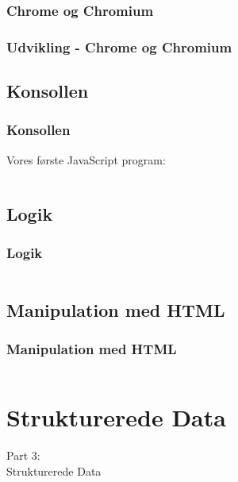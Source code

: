 \subsubsection{Chrome og Chromium}
\begin{frame}
    \frametitle{Udvikling - Chrome og Chromium}
    \begin{center}
    \end{center}
\end{frame}

\subsection{Konsollen}
\begin{frame}
    \frametitle{Konsollen}
    Vores første JavaScript program:
    \inputminted{javascript}{../src/frontend/part2_hello/logic.js}
\end{frame}

\subsection{Logik}
\begin{frame}
    \frametitle{Logik}
    \inputminted{javascript}{../src/frontend/part2_console/logic.js}
\end{frame}

\subsection{Manipulation med HTML}
\begin{frame}
    \frametitle{Manipulation med HTML}
    \vspace{-1mm}
    \inputminted[highlightlines={1,9,11,13},breaklines=true]{javascript}{../src/frontend/part2_html/logic.js}
\end{frame}

\section{Strukturerede Data}
\begin{frame}
    \vspace{25mm}
    \begin{center}
        \Huge{Part 3:\\Strukturerede Data}
    \end{center}
\end{frame}

